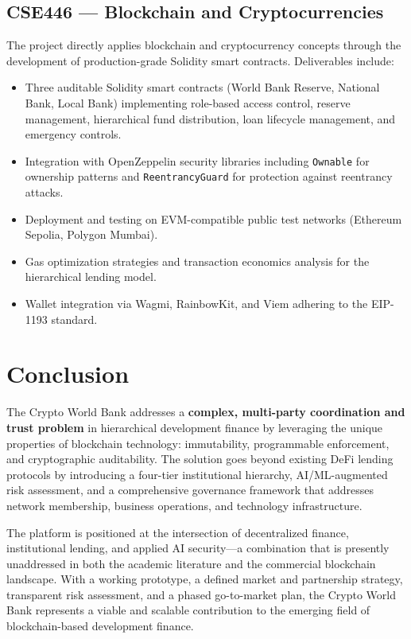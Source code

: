 \documentclass[11pt,a4paper]{article}
\begin{document}
\subsection{CSE446 --- Blockchain and Cryptocurrencies}

The project directly applies blockchain and cryptocurrency concepts through the development of production-grade Solidity smart contracts. Deliverables include:
\begin{itemize}[noitemsep]
\item Three auditable Solidity smart contracts (World Bank Reserve, National Bank, Local Bank) implementing role-based access control, reserve management, hierarchical fund distribution, loan lifecycle management, and emergency controls.
\item Integration with OpenZeppelin security libraries including \texttt{Ownable} for ownership patterns and \texttt{ReentrancyGuard} for protection against reentrancy attacks.
\item Deployment and testing on EVM-compatible public test networks (Ethereum Sepolia, Polygon Mumbai).
\item Gas optimization strategies and transaction economics analysis for the hierarchical lending model.
\item Wallet integration via Wagmi, RainbowKit, and Viem adhering to the EIP-1193 standard.
\end{itemize}

\section{Conclusion}

The Crypto World Bank addresses a \textbf{complex, multi-party coordination and trust problem} in hierarchical development finance by leveraging the unique properties of blockchain technology: immutability, programmable enforcement, and cryptographic auditability. The solution goes beyond existing DeFi lending protocols by introducing a four-tier institutional hierarchy, AI/ML-augmented risk assessment, and a comprehensive governance framework that addresses network membership, business operations, and technology infrastructure.

The platform is positioned at the intersection of decentralized finance, institutional lending, and applied AI security---a combination that is presently unaddressed in both the academic literature and the commercial blockchain landscape. With a working prototype, a defined market and partnership strategy, transparent risk assessment, and a phased go-to-market plan, the Crypto World Bank represents a viable and scalable contribution to the emerging field of blockchain-based development finance.
\end{document}
